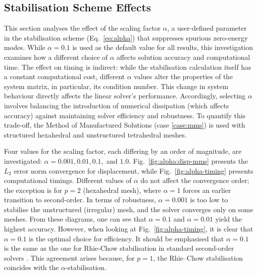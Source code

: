 \documentclass[review,3p]{elsarticle}
\begin{document}
\subsection{Stabilisation Scheme Effects}
\label{case:Stabilisation_Scheme_Effects}
%
This section analyses the effect of the scaling factor $\alpha$, a user-defined parameter in the stabilisation scheme (Eq.~\eqref{eq:alpha}) that suppresses spurious zero-energy modes. While $\alpha=0.1$ is used as the default value for all results, this investigation examines how a different choice of $\alpha$ affects solution accuracy and computational time.
The effect on timing is indirect: while the stabilisation calculation itself has a constant computational cost, different $\alpha$ values alter the properties of the system matrix, in particular, its condition number. 
This change in system behaviour directly affects the linear solver's performance. 
Accordingly, selecting $\alpha$ involves balancing the introduction of numerical dissipation (which affects accuracy) against maintaining solver efficiency and robustness. 
To quantify this trade-off, the Method of Manufactured Solutions (case \ref{case:mms}) is used with structured hexahedral and unstructured tetrahedral meshes.

Four values for the scaling factor, 
each differing by an order of magnitude, are investigated: $\alpha = 0.001, 0.01, 0.1,$ and $1.0$. 
Fig.~\ref{fig:alpha:disp-mms} presents the $L_2$ error norm convergence for displacement, while Fig.~\ref{fig:alpha-timing} presents computational timings. 
Different values of $\alpha$ do not affect the convergence order; the exception is for $p=2$ (hexahedral mesh), where $\alpha=1$ forces an earlier transition to second-order. 
In terms of robustness, $\alpha=0.001$ is too low to stabilise the unstructured (irregular) mesh, and the solver converges only on some meshes. 
From these diagrams, one can see that $\alpha=0.1$ and $\alpha=0.01$ yield the highest accuracy. However, when looking at Fig.~\ref{fig:alpha-timing}, it is clear that $\alpha=0.1$ is the optimal choice for efficiency. 
It should be emphasised that $\alpha=0.1$ is the same as the one for Rhie-Chow stabilisation in standard second-order solvers \cite{Cardiff2026}.
This agreement arises because, for $p=1$, the Rhie–Chow stabilisation coincides with the $\alpha$-stabilisation.
\end{document}
